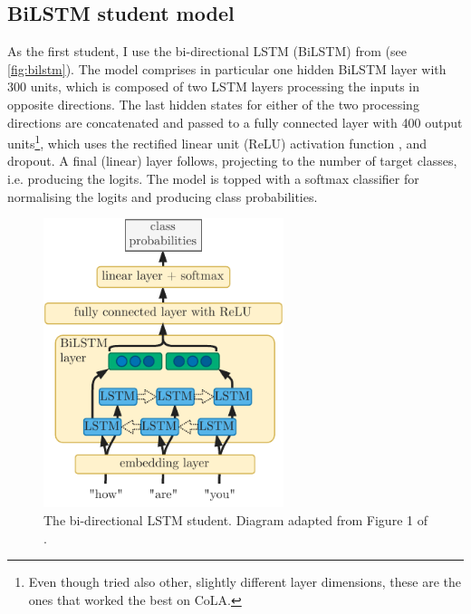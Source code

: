 \documentclass[bsc,frontabs,singlespacing,parskip,deptreport]{infthesis}
\begin{document}
{{    \subsection{BiLSTM student model}{
      \label{sec:student-bilstm}
      As the first student, I use the bi-directional LSTM (BiLSTM) from \citeauthor{Tang_2019b} (see \autoref{fig:bilstm}). The model comprises in particular one hidden BiLSTM layer with 300 units, which is composed of two LSTM layers processing the inputs in opposite directions. The last hidden states for either of the two processing directions are concatenated and passed to a fully connected layer with 400 output units\footnote{Even though \citeauthor{Tang_2019b} tried also other, slightly different layer dimensions, these are the ones that worked the best on CoLA.}, which uses the rectified linear unit (ReLU) activation function \citep{Nair_2010}, and dropout. A final (linear) layer follows, projecting to the number of target classes, i.e. producing the logits. The model is topped with a softmax classifier for normalising the logits and producing class probabilities.
      \begin{figure}[h!t]
        \centering
        \includegraphics[width=7cm]{graphics/bilstm}
        \caption{The bi-directional LSTM student. Diagram adapted from Figure 1 of \citet{Tang_2019a}.}
        \label{fig:bilstm}
      \end{figure}

}}}
\end{document}
